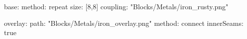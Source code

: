 base:
  method: repeat
  size: [8,8]
  coupling: "Blocks/Metals/iron_rusty.png"

overlay:
  path: "Blocks/Metals/iron_overlay.png"
  method: connect
  innerSeams: true
